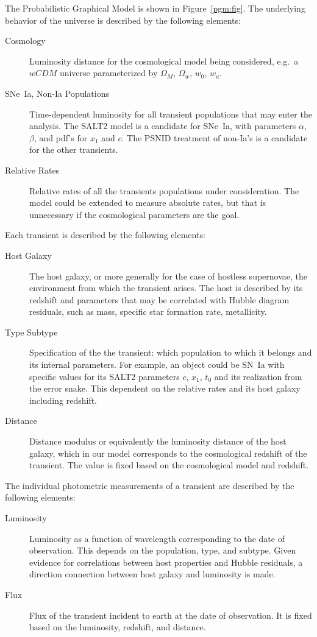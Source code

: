 \documentclass[preprint,3p]{elsarticle}
\begin{document}
The Probabilistic Graphical Model is shown in Figure~\ref{pgm:fig}. The underlying behavior of the universe is described by the following elements:
\begin{description}
\item [Cosmology] Luminosity distance for the cosmological model being considered,
e.g.\ a $wCDM$ universe parameterized by $\Omega_M$, $\Omega_w$, $w_0$, $w_a$.
\item[SNe~Ia, Non-Ia Populations] Time-dependent luminosity for all transient populations
that may enter
the analysis.  The SALT2 model is a candidate for SNe~Ia, with parameters $\alpha$, $\beta$,
and pdf's for $x_1$ and $c$.  The PSNID treatment of non-Ia's is a candidate for the other
transients.
\item [Relative Rates] Relative rates of all the transients populations under consideration.  The
model could be extended to measure absolute rates, but that is unnecessary if
the cosmological parameters are the goal.
\end{description}
Each transient is described by the following elements:
\begin{description}
\item[Host Galaxy] The host galaxy, or more generally for the case of hostless supernovae,
the environment from which the transient arises.  The host is described by its redshift
and parameters that may be correlated with Hubble diagram residuals, such as mass,
specific star formation rate, metallicity.
\item[Type Subtype] Specification of the the transient: which population to which it belongs
and its internal parameters.  For example, an object could be SN~Ia with specific
values for its SALT2 parameters $c$, $x_1$, $t_0$ and its realization
from the error snake.  This dependent on the relative rates and
its host galaxy including redshift.
\item[Distance] Distance modulus or equivalently the luminosity distance of the host galaxy,
which in our model corresponds to the cosmological redshift of the transient.  The value
is fixed based on the cosmological model and redshift.
\end{description}
The individual photometric measurements of a transient are described by the following
elements:
\begin{description}
\item[Luminosity]  Luminosity as a function of wavelength
corresponding to the date of observation.   This depends on the population, type,
and subtype.  Given evidence for correlations between host properties and Hubble
residuals, a direction connection between host galaxy and luminosity is made.
\item[Flux] Flux of the transient incident to earth at the date of observation.  It is 
fixed based on the luminosity, redshift, and distance.
\end{description}
\end{document}
